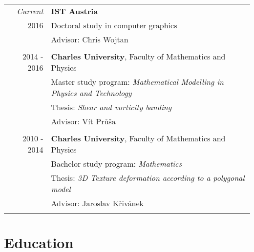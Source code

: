 \documentclass[a4paper,10pt]{article} %
\begin{document}
\begin{tabular}{rl}
  
  \emph{Current} & \textbf{IST Austria}\\
  2016           & Doctoral study in computer graphics \\
                 & Advisor: Chris Wojtan \\
                 &\\

  
  2014 - 2016 & \textbf{Charles University}, Faculty of Mathematics and Physics \\
                 & Master study program: \emph{Mathematical Modelling in Physics and Technology} \\
                 & Thesis: \emph{Shear and vorticity banding} \\
                 & Advisor: Vít Průša \\
                 &\\
  

  2010 - 2014 & \textbf{Charles University}, Faculty of Mathematics and Physics \\
                 & Bachelor study program: \emph{Mathematics} \\
                 & Thesis: \emph{3D Texture deformation according to a polygonal model} \\
                 & Advisor: Jaroslav Křivánek \\
                 &\\

\end{tabular}


\section{Education}
\end{document}
